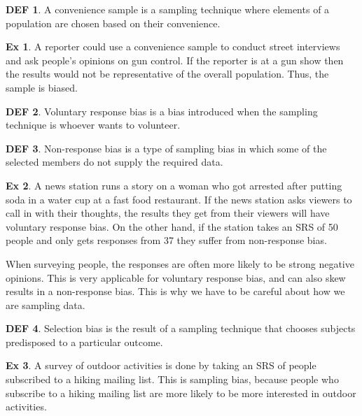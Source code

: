 \documentclass{article}
\theoremstyle{definition}\newtheorem{definition}{DEF}
\theoremstyle{definition}\newtheorem{example}{Ex}
\theoremstyle{lemma}\newtheorem{lemma}{Lemma}
\theoremstyle{corrolary}\newtheorem{corrolary}{Cor}
\begin{document}
\begin{definition}
A convenience sample is a sampling technique where elements of a population are chosen based on their convenience.
\end{definition}

\begin{example}
A reporter could use a convenience sample to conduct street interviews and ask people's opinions on gun control.
If the reporter is at a gun show then the results would not be representative of the overall population.
Thus, the sample is biased.
\end{example}

\begin{definition}
Voluntary response bias is a bias introduced when the sampling technique is whoever wants to volunteer.
\end{definition}

\begin{definition}
Non-response bias is a type of sampling bias in which some of the selected members do not supply the required data.
\end{definition}

\begin{example}
A news station runs a story on a woman who got arrested after putting soda in a water cup at a fast food restaurant.
If the news station asks viewers to call in with their thoughts, the results they get from their viewers will have voluntary response bias.
On the other hand, if the station takes an SRS of 50 people and only gets responses from 37 they suffer from non-response bias.
\end{example}

When surveying people, the responses are often more likely to be strong negative opinions.
This is very applicable for voluntary response bias, and can also skew results in a non-response bias.
This is why we have to be careful about how we are sampling data.

\begin{definition}
Selection bias is the result of a sampling technique that chooses subjects predisposed to a particular outcome.
\end{definition}

\begin{example}
A survey of outdoor activities is done by taking an SRS of people subscribed to a hiking mailing list.
This is sampling bias, because people who subscribe to a hiking mailing list are more likely to be more interested in outdoor activities.
\end{example}
\end{document}
